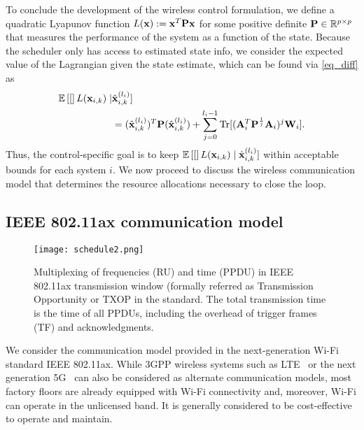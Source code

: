 To conclude the development of the wireless control formulation, we define a quadratic Lyapunov function $L({\mathbf x}) := {\mathbf x}^T {\mathbf P} {\mathbf x}$ for some positive definite ${\mathbf P} \in {\mathbb R}^{p \times p}$ that measures the performance of the system as a function of the state. Because the scheduler only has access to estimated state info, we consider the expected value of the Lagrangian given the state estimate, which can be found via \eqref{eq_diff} as
%
\begin{align}
\E [L(\bbx_{i,k}) \mid &\hbx^{(l_i)}_{i,k}]  \label{eq_perf} \\
&=  (\hbx^{(l_i)}_{i,k})^T \bbP (\hbx^{(l_i)}_{i,k}) + \sum_{j=0}^{l_i-1} \Tr[(\bbA_i^T\bbP^{\frac{1}{j}}\bbA_i)^{j} \bbW_i]. \nonumber
\end{align}
%
Thus, the control-specific goal is to keep ${\mathbb E}\left[[\right]L({\mathbf x}_{i,k}) \mid {\hat{\ensuremath{\mathbf x}} }^{(l_i)}_{i,k}]$ within acceptable bounds for each system $i$. We now proceed to discuss the wireless communication model that determines the resource allocations necessary to close the loop.

\subsection{IEEE 802.11ax communication model}\label{sec_comm_model}

\begin{figure}
%
\texttt{[image: schedule2.png]}
\caption{Multiplexing of frequencies (RU) and time (PPDU) in IEEE 802.11ax transmission window (formally referred as Transmission Opportunity or TXOP in the standard. The total transmission time is the time of all PPDUs, including the overhead of trigger frames (TF) and acknowledgments.}
\label{fig_multiplex}
\end{figure}

We consider the communication model provided in the next-generation Wi-Fi standard IEEE 802.11ax. While 3GPP wireless systems such as LTE~\cite{sesia2011lte} or the next generation 5G~\cite{agiwal2016next} can also be considered as alternate communication models, most factory floors are already equipped with Wi-Fi connectivity and, moreover, Wi-Fi can operate in the unlicensed band. It is generally considered to be cost-effective to operate and maintain.

